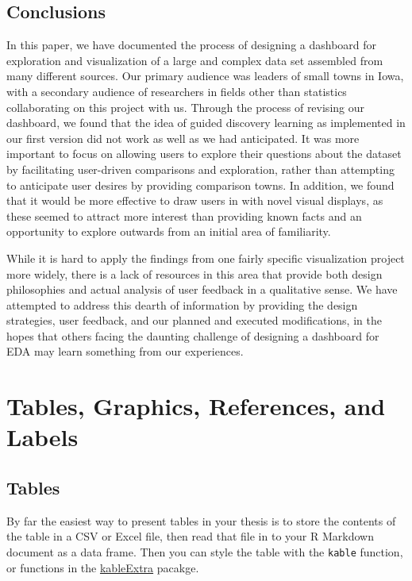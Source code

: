 \documentclass[print]{nuthesis}
\begin{document}
\section{Conclusions}

In this paper, we have documented the process of designing a dashboard for exploration and visualization of a large and complex data set assembled from many different sources. Our primary audience was leaders of small towns in Iowa, with a secondary audience of researchers in fields other than statistics collaborating on this project with us. Through the process of revising our dashboard, we found that the idea of guided discovery learning as implemented in our first version did not work as well as we had anticipated. It was more important to focus on allowing users to explore their questions about the dataset by facilitating user-driven comparisons and exploration, rather than attempting to anticipate user desires by providing comparison towns. In addition, we found that it would be more effective to draw users in with novel visual displays, as these seemed to attract more interest than providing known facts and an opportunity to explore outwards from an initial area of familiarity.

While it is hard to apply the findings from one fairly specific visualization project more widely, there is a lack of resources in this area that provide both design philosophies and actual analysis of user feedback in a qualitative sense. We have attempted to address this dearth of information by providing the design strategies, user feedback, and our planned and executed modifications, in the hopes that others facing the daunting challenge of designing a dashboard for EDA may learn something from our experiences.

\hypertarget{ref-labels}{%
\chapter{Tables, Graphics, References, and Labels}\label{ref-labels}}

\hypertarget{tables}{%
\section{Tables}\label{tables}}

By far the easiest way to present tables in your thesis is to store the contents of the table in a CSV or Excel file, then read that file in to your R Markdown document as a data frame. Then you can style the table with the \texttt{kable} function, or functions in the \href{https://cran.r-project.org/web/packages/kableExtra/index.html}{kableExtra} pacakge.
\end{document}
